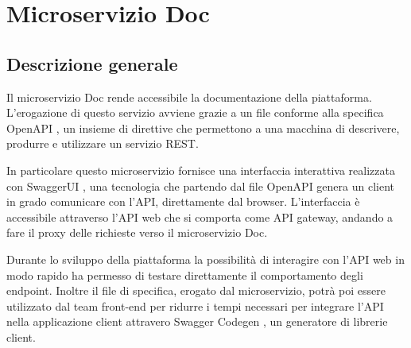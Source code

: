 \section{Microservizio Doc}
\subsection{Descrizione generale}
Il microservizio Doc rende accessibile la documentazione della piattaforma.
L'erogazione di questo servizio avviene grazie a un file conforme alla specifica OpenAPI \cite{openAPI},
un insieme di direttive che permettono a una macchina di descrivere, produrre e utilizzare
un servizio REST.

In particolare questo microservizio fornisce una interfaccia interattiva realizzata con
SwaggerUI \cite{SwaggerUI}, una tecnologia che partendo dal file OpenAPI genera un client in grado comunicare con l'API, direttamente
dal browser. L'interfaccia è accessibile attraverso l'API web che si comporta
come API gateway, andando a fare il proxy delle richieste verso il microservizio Doc.

Durante lo sviluppo della piattaforma la possibilità di interagire con l'API web in modo rapido ha permesso
di testare direttamente il comportamento degli endpoint. Inoltre il file di specifica, erogato dal microservizio,
potrà poi essere utilizzato dal team front-end per ridurre i tempi necessari per integrare l'API nella applicazione client
attravero Swagger Codegen \cite{SwaggerCodegen}, un generatore di librerie client.